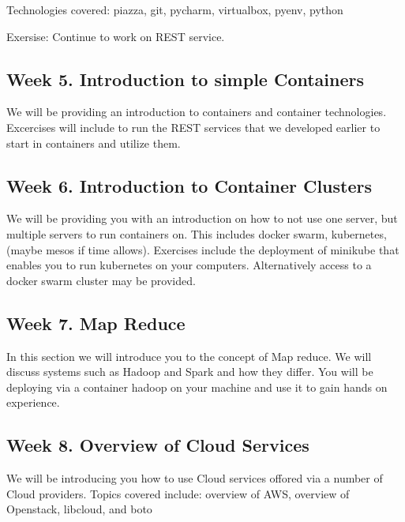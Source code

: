 Technologies covered:	piazza,	git,	pycharm,	virtualbox,	pyenv,	python

Exersise: Continue to work on REST service.

\subsection{Week 5. Introduction to simple Containers}

We will be providing an introduction to containers and container
technologies. Excercises will include to run the REST services that we
developed earlier to start in containers and utilize them.


\subsection{Week 6. Introduction to Container Clusters}

We will be providing you with an introduction on how to not use one
server, but multiple servers to run containers on. This includes
docker swarm, kubernetes, (maybe mesos if time allows).
Exercises include the deployment of minikube that enables you to run
kubernetes on your computers. Alternatively access to a docker swarm
cluster may be provided.


\subsection{Week 7. Map Reduce}

In this section we will introduce you to the concept of Map reduce. We
will discuss systems such as Hadoop and Spark and how they differ. You
will be deploying via a container hadoop on your machine and use it to
gain hands on experience.

\subsection{Week 8. Overview of Cloud Services}

We will be introducing you how to use Cloud services offored via a
number of Cloud providers. Topics covered include: overview of AWS,
overview of Openstack, libcloud, and boto

